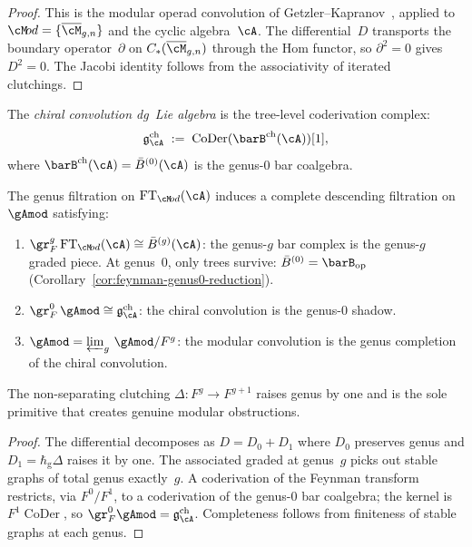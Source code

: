 \begin{proof}
This is the modular operad convolution of
Getzler--Kapranov~\cite[\S4--5]{GeK98}, applied to
$\cM\!od = \{\overline{\cM}_{g,n}\}$ and the cyclic
algebra~$\cA$. The differential~$D$ transports the boundary
operator~$\partial$ on $C_*(\overline{\cM}_{g,n})$ through the
Hom functor, so $\partial^2 = 0$ gives $D^2 = 0$. The Jacobi
identity follows from the associativity of iterated clutchings.
\end{proof}

\begin{definition}
\label{def:chiral-convolution-vol1}
The \emph{chiral convolution dg~Lie algebra} is the tree-level
coderivation complex:
\[
\mathfrak{g}^{\mathrm{ch}}_\cA
\;:=\;
\operatorname{CoDer}(\barB^{\mathrm{ch}}(\cA))[1],
\]
where $\barB^{\mathrm{ch}}(\cA) = \bar{B}^{(0)}(\cA)$ is the
genus-$0$ bar coalgebra.
\end{definition}

\begin{theorem}
\label{thm:vol1-genus-completion}
The genus filtration on $\mathrm{FT}_{\cM\!od}(\cA)$ induces a
complete descending filtration on~$\gAmod$ satisfying:
\begin{enumerate}[label=\textup{(\roman*)}]
\item $\gr_F^g\, \mathrm{FT}_{\cM\!od}(\cA) \cong
 \bar{B}^{(g)}(\cA)$: the genus-$g$ bar complex is the
 genus-$g$ graded piece. At genus~$0$, only trees survive:
 $\bar{B}^{(0)} = \barB_{\mathrm{op}}$
 \textup{(}Corollary~\textup{\ref{cor:feynman-genus0-reduction}}\textup{)}.

\item $\gr_F^0\, \gAmod \cong \mathfrak{g}^{\mathrm{ch}}_\cA$:
 the chiral convolution is the genus-$0$ shadow.

\item $\gAmod = \varprojlim_g\, \gAmod / F^g$:
 the modular convolution is the genus completion of the
 chiral convolution.
\end{enumerate}
The non-separating clutching $\Delta \colon F^g \to F^{g+1}$
raises genus by one and is the sole primitive that creates
genuine modular obstructions.
\end{theorem}

\begin{proof}
The differential decomposes as $D = D_0 + D_1$ where
$D_0$ preserves genus and $D_1 = \hbar_{\mathrm{g}}\Delta$ raises it by one.
The associated graded at genus~$g$ picks out stable graphs of
total genus exactly~$g$. A coderivation of the Feynman transform
restricts, via $F^0/F^1$, to a coderivation of the genus-$0$ bar
coalgebra; the kernel is $F^1\operatorname{CoDer}$, so $\gr^0_F \gAmod =
\mathfrak{g}^{\mathrm{ch}}_\cA$. Completeness follows from
finiteness of stable graphs at each genus.
\end{proof}

